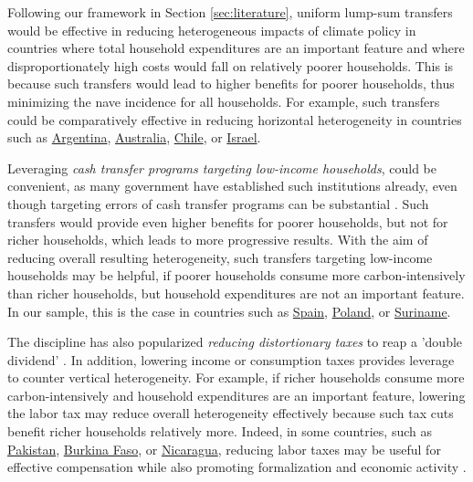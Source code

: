 \documentclass[12pt, a4paper]{article}
\begin{document}
Following our framework in Section \ref{sec:literature}, uniform lump-sum transfers would be effective in reducing heterogeneous impacts of climate policy in countries where total household expenditures are an important feature and where disproportionately high costs would fall on relatively poorer households. This is because such transfers would lead to higher benefits for poorer households, thus minimizing the nave incidence for all households. For example, such transfers could be comparatively effective in reducing horizontal heterogeneity in countries such as \hyperref[fig:5b_ARG]{Argentina}, \hyperref[fig:5b_AUS]{Australia}, \hyperref[fig:5b_CHL]{Chile}, or \hyperref[fig:5b_ISR]{Israel}. %

Leveraging \textit{cash transfer programs targeting low-income households}, could be convenient, as many government have established such institutions already, even though targeting errors of cash transfer programs can be substantial \autocite{Banerjee.2022,Bah.2019}. Such transfers would provide even higher benefits for poorer households, but not for richer households, which leads to more progressive results. With the aim of reducing overall resulting heterogeneity, such transfers targeting low-income households may be helpful, if poorer households consume more carbon-intensively than richer households, but household expenditures are not an important feature. In our sample, this is the case in countries such as \hyperref[fig:5b_ESP]{Spain}, \hyperref[fig:5b_POL]{Poland}, or \hyperref[fig:5b_SUR]{Suriname}.

The discipline has also popularized \textit{reducing distortionary taxes} to reap a 'double dividend' \autocite{Bovenberg.1996}. In addition, lowering income or consumption taxes provides leverage to counter vertical heterogeneity. For example, if richer households consume more carbon-intensively and household expenditures are an important feature, lowering the labor tax may reduce overall heterogeneity effectively because such tax cuts benefit richer households relatively more. Indeed, in some countries, such as \hyperref[fig:5b_PAK]{Pakistan}, \hyperref[fig:5b_BFA]{Burkina Faso}, or \hyperref[fig:5b_NIC]{Nicaragua}, reducing labor taxes may be useful for effective compensation while also promoting formalization \autocite{Jessen.2021,Rocha.2018} and economic activity \autocite{Ulyssea.2018}.
\end{document}
